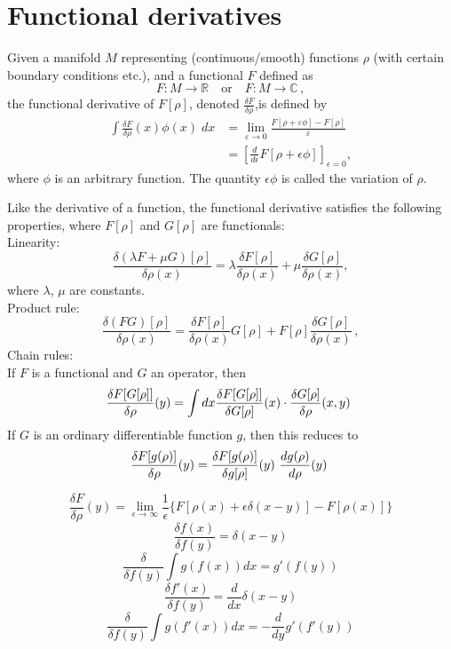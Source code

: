 \documentclass[cyan]{elegantnote}
\begin{document}
\section{Functional derivatives}
\begin{newdef}
	Given a manifold $M$ representing (continuous/smooth) functions $\rho$ (with certain boundary conditions etc.), and a functional $F$ defined as
	\[F\colon M\rightarrow \mathbb {R} \quad {\mbox{or}}\quad F\colon M\rightarrow \mathbb {C} \,,\]
	the functional derivative of $F[\rho]$, denoted $\frac{\delta F}{\delta \rho}$,is defined by
	\[{\begin{aligned}\int {\frac {\delta F}{\delta \rho }}(x)\phi (x)\;dx&=\lim _{\varepsilon \to 0}{\frac {F[\rho +\varepsilon \phi ]-F[\rho ]}{\varepsilon }}\\&=\left[{\frac {d}{d\epsilon }}F[\rho +\epsilon \phi ]\right]_{\epsilon =0},\end{aligned}}\]
	where $\phi$ is an arbitrary function. The quantity $\epsilon \phi$ is called the variation of $\rho$. 
\end{newdef}
Like the derivative of a function, the functional derivative satisfies the following properties, where $F[\rho]$ and $G[\rho]$ are functionals:\\
Linearity:
\[{\frac {\delta (\lambda F+\mu G)[\rho ]}{\delta \rho (x)}}=\lambda {\frac {\delta F[\rho ]}{\delta \rho (x)}}+\mu {\frac {\delta G[\rho ]}{\delta \rho (x)}},\]
where $\lambda$, $\mu$ are constants.\\
Product rule:
\[{\frac {\delta (FG)[\rho ]}{\delta \rho (x)}}={\frac {\delta F[\rho ]}{\delta \rho (x)}}G[\rho ]+F[\rho ]{\frac {\delta G[\rho ]}{\delta \rho (x)}}\,,\]
Chain rules:\\
If $F$ is a functional and $G$ an operator, then
\[{\displaystyle \displaystyle {\frac {\delta F[G[\rho ]]}{\delta \rho }(y)}=\int dx{\frac {\delta F[G[\rho]]}{\delta G[\rho]}}(x)\cdot {\frac {\delta G[\rho ]}{\delta \rho}(x,y)}\ }\]
If $G$ is an ordinary differentiable function $g$, then this reduces to
\[{\displaystyle \displaystyle {\frac {\delta F[g(\rho )]}{\delta \rho}(y)}={\frac {\delta F[g(\rho )]}{\delta g[\rho ]}(y)}\ {\frac {dg(\rho )}{d\rho }(y)}\ } \]
\begin{newprop}
	\[\frac{\delta F}{\delta \rho} (y) = \lim_{\epsilon \to \infty} \frac{1}{\epsilon} \{ F[\rho(x) + \epsilon \delta(x-y)] - F[\rho(x)] \}\]
	\[\frac{\delta f(x)}{\delta f(y)} = \delta(x-y)\]
	\[\frac{\delta}{\delta f(y)} \int g\left( f(x)\right) dx =  g'(f(y))\]
	\[\frac{\delta f'(x)}{\delta f(y)} = \frac{d}{dx}\delta(x-y)\]
	\[\frac{\delta}{\delta f(y)} \int g\left( f'(x)\right) dx = -\frac{d}{dy} g'(f'(y))\]
\end{newprop}
\end{document}
